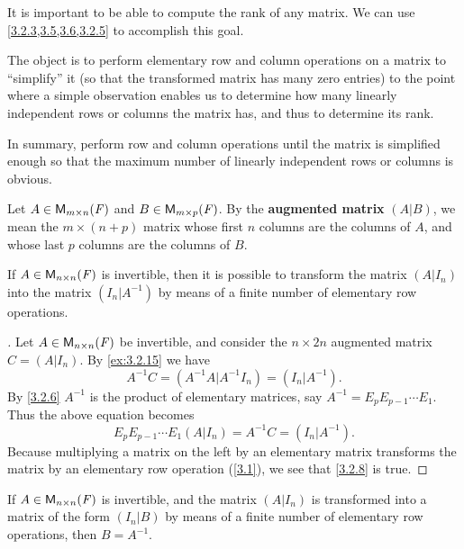 \begin{note}
  It is important to be able to compute the rank of any matrix.
  We can use \cref{3.2.3,3.5,3.6,3.2.5} to accomplish this goal.

  The object is to perform elementary row and column operations on a matrix to ``simplify'' it (so that the transformed matrix has many zero entries) to the point where a simple observation enables us to determine how many linearly independent rows or columns the matrix has, and thus to determine its rank.

  In summary, perform row and column operations until the matrix is simplified enough so that the maximum number of linearly independent rows or columns is obvious.
\end{note}

\begin{defn}\label{3.2.7}
  Let \(A \in \mathsf{M}_{{m} \times n}({\mathit{F}})\) and \(B \in \mathsf{M}_{{m} \times p}({\mathit{F}})\).
  By the \textbf{augmented matrix} \((A | B)\), we mean the \(m \times (n + p)\) matrix whose first \(n\) columns are the columns of \(A\), and whose last \(p\) columns are the columns of \(B\).
\end{defn}

\begin{cor}\label{3.2.8}
  If \(A \in \mathsf{M}_{{n} \times n}({\mathit{F}})\) is invertible, then it is possible to transform the matrix \((A | I_n)\) into the matrix \((I_n | A^{-1})\) by means of a finite number of elementary row operations.
\end{cor}

\begin{proof}[]
  Let \(A \in \mathsf{M}_{{n} \times n}({\mathit{F}})\) be invertible, and consider the \(n \times 2n\) augmented matrix \(C = (A | I_n)\).
  By \cref{ex:3.2.15} we have
  \[
    A^{-1} C = (A^{-1} A | A^{-1} I_n) = (I_n | A^{-1}).
  \]
  By \cref{3.2.6} \(A^{-1}\) is the product of elementary matrices, say \(A^{-1} = E_p E_{p - 1} \cdots E_1\).
  Thus the above equation becomes
  \[
    E_p E_{p - 1} \cdots E_1 (A | I_n) = A^{-1} C = (I_n | A^{-1}).
  \]
  Because multiplying a matrix on the left by an elementary matrix transforms the matrix by an elementary row operation (\cref{3.1}), we see that \cref{3.2.8} is true.
\end{proof}

\begin{cor}\label{3.2.9}
  If \(A \in \mathsf{M}_{{n} \times n}({\mathit{F}})\) is invertible, and the matrix \((A | I_n)\) is transformed into a matrix of the form \((I_n | B)\) by means of a finite number of elementary row operations, then \(B = A^{-1}\).
\end{cor}

